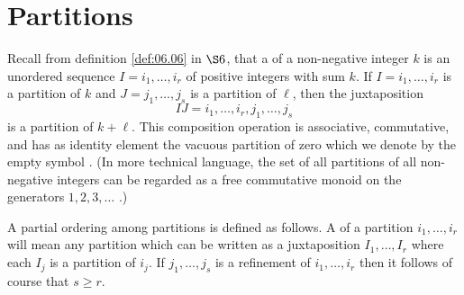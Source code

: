 \documentclass[../main]{subfiles}
\begin{document}
\section{Partitions}
Recall from definition \ref{def:06.06} in $\S6$, that a  of a non-negative integer $k$ is an unordered sequence $I = i_1, \ldots, i_r$ of positive integers with sum $k$. If $I = i_1, \ldots, i_r$ is a partition of $k$ and $J = j_1, \ldots, j_s$ is a partition of $\ell$, then the juxtaposition \[IJ = i_1, \ldots, i_r, j_1, \ldots, j_s\] is a partition of $k + \ell$. This composition operation is associative, commutative, and has as identity element the vacuous partition of zero which we denote by the empty symbol \phantom{empty}. (In more technical language, the set of all partitions of all non-negative integers can be regarded as a free commutative monoid on the generators $1, 2, 3, \ldots$ .)

A partial ordering among partitions is defined as follows. A  of a partition $i_1, \ldots, i_r$ will mean any partition which can be written as a juxtaposition $I_1, \ldots, I_r$ where each $I_j$ is a partition of $i_j$. If $j_1, \ldots, j_s$ is a refinement of $i_1, \ldots, i_r$ then it follows of course that $s \ge r$. 
\end{document}
